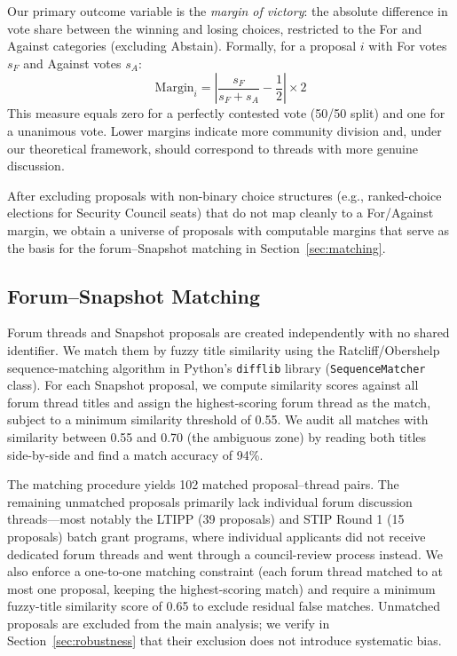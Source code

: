 \documentclass[12pt]{article}
\begin{document}
Our primary outcome variable is the \emph{margin of victory}: the absolute difference
in vote share between the winning and losing choices, restricted to the For and
Against categories (excluding Abstain). Formally, for a proposal $i$ with For votes
$s_F$ and Against votes $s_A$:
\[
  \text{Margin}_i = \left|\frac{s_F}{s_F + s_A} - \frac{1}{2}\right| \times 2
\]
This measure equals zero for a perfectly contested vote (50/50 split) and one for
a unanimous vote. Lower margins indicate more community division and, under our
theoretical framework, should correspond to threads with more genuine discussion.

After excluding proposals with non-binary choice structures (e.g., ranked-choice
elections for Security Council seats) that do not map cleanly to a For/Against
margin, we obtain a universe of proposals with computable margins that serve as
the basis for the forum--Snapshot matching in Section~\ref{sec:matching}.

\subsection{Forum--Snapshot Matching}

Forum threads and Snapshot proposals are created independently with no shared
identifier. We match them by fuzzy title similarity using the Ratcliff/Obershelp
sequence-matching algorithm in Python's \texttt{difflib} library
(\texttt{SequenceMatcher} class). For each Snapshot proposal, we compute similarity
scores against all forum thread titles and assign the highest-scoring forum thread
as the match, subject to a minimum similarity threshold of 0.55. We audit all
matches with similarity between 0.55 and 0.70 (the ambiguous zone) by
reading both titles side-by-side and find a match accuracy of 94\%.

The matching procedure yields 102 matched proposal--thread pairs. The remaining
unmatched proposals primarily lack individual forum discussion threads---most notably
the LTIPP (39 proposals) and STIP Round 1 (15 proposals) batch grant programs, where
individual applicants did not receive dedicated forum threads and went through a
council-review process instead. We also enforce a one-to-one matching constraint
(each forum thread matched to at most one proposal, keeping the highest-scoring match)
and require a minimum fuzzy-title similarity score of 0.65 to exclude residual false
matches. Unmatched proposals are excluded from the main analysis; we verify in
Section~\ref{sec:robustness} that their exclusion does not introduce systematic bias.
\end{document}
